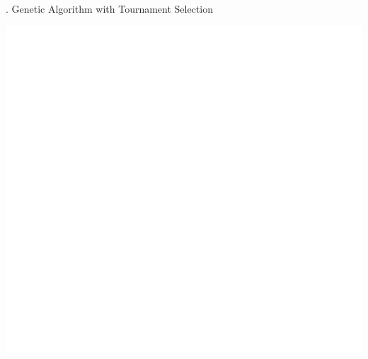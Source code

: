 \documentclass[9pt]{beamer}
\begin{document}
\begin{frame}{\theframenumber. Genetic Algorithm with Tournament Selection}
  \begin{center}
  \includegraphics[height=.85\textheight,width=\textwidth]{../images/tournament.png}
  \end{center}
\end{frame}

\end{document}
